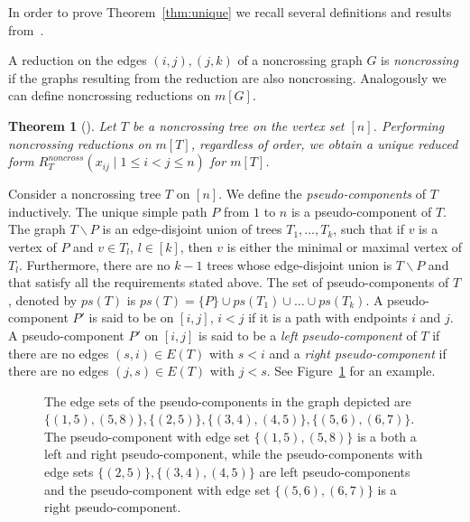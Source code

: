 \documentclass[10pt]{amsart}
\newtheorem{theo}{Theorem}[section]
\theoremstyle{definition}
\numberwithin{equation}{section}
\newcommand*\+{\smash{\lower2pt\hbox{\rlap{\vrule height14pt}}\raise2pt\hbox{\rlap{\hskip-3pt \vrule height.4pt depth0pt width14.7pt}}}}
\begin{document}
In order to prove Theorem~\ref{thm:unique} we recall several definitions and results from~\cite{root1}.

A reduction on the edges $(i,j),(j,k)$ of a noncrossing graph $G$ is \emph{noncrossing} if the graphs resulting from the reduction are also noncrossing. Analogously we can define noncrossing reductions on $m[G]$.

\begin{theo}[\cite{root1}]\label{thm:noncross}
Let $T$ be a noncrossing tree on the vertex set $[n]$. Performing noncrossing reductions on $m[T]$, regardless of order, we obtain a unique reduced form $R^{noncross}_T(x_{ij} \mid 1\leq i<j\leq n)$ for $m[T]$.
\end{theo}

Consider a noncrossing tree $T$ on $[n]$. We define the \emph{pseudo-components} of $T$ inductively. The unique simple path $P$ from $1$ to $n$ is a pseudo-component of $T$. The graph $T\backslash P$ is an edge-disjoint union of trees $T_1, \dots, T_k$, such that if $v$ is a vertex of $P$ and $v \in T_l$, $l \in [k]$, then $v$ is either the minimal or maximal vertex of $T_l$. Furthermore, there are no $k-1$ trees whose edge-disjoint union is $T\backslash P$ and that satisfy all the requirements stated above. The set of pseudo-components of $T$, denoted by $ps(T)$ is $ps(T)=\{P\} \cup ps(T_1)\cup \dots \cup ps(T_k)$. A pseudo-component $P'$ is said to be on $[i, j]$, $i<j$ if it is a path with endpoints $i$ and $j$. A pseudo-component $P' $ on $[i, j]$ is said to be a \emph{left pseudo-component} of $T$ if there are no edges $(s, i) \in E(T)$ with $s<i$ and a \emph{right pseudo-component} if there are no edges $(j, s) \in E(T)$ with $j<s$. See Figure~\ref{fig:pseudo} for an example.

\begin{figure}[htbp]
\begin{center} 
\caption{The edge sets of the pseudo-components in the graph depicted are $\{(1, 5), (5, 8)\}, \{(2, 5)\}, \{(3, 4), (4, 5)\}, \{(5, 6), (6, 7)\}$. The pseudo-component with edge set $\{(1, 5), (5, 8)\}$ is a both a left and right pseudo-component, while the pseudo-components with edge sets $ \{(2, 5)\}, \{(3, 4), (4, 5)\}$ are left pseudo-components and the pseudo-component with edge set $\{(5, 6), (6, 7)\}$ is a right pseudo-component.}\label{fig:pseudo}
\end{center}
\end{figure}
\end{document}
